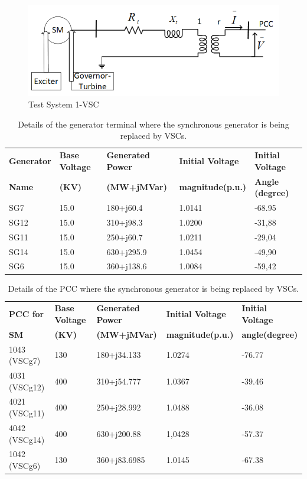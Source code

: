 \documentclass{report}
\begin{document}
\begin{figure}
    \centering
    \includegraphics[width=0.7\linewidth]{Figure_Nordic/SMIB.png}
    \caption{Test System 1-VSC}
    \label{fig:SMVSC}
\end{figure}

\begin{table}[H]
\centering
\caption{Details of the generator terminal where the synchronous generator is being replaced by VSCs.}
\begin{tabular}{|l |l| l| l| l|}
\hline
\textbf{Generator} & \textbf{Base Voltage} & \textbf{Generated Power} & \textbf{Initial Voltage}& \textbf{Initial Voltage} \\
\textbf{Name} & \textbf{(KV)} & \textbf{(MW+jMVar)} & \textbf{magnitude(p.u.)} & \textbf{Angle (degree)} \\
\hline
SG7 & 15.0 & 180+j60.4 & 1.0141 & -68.95 \\
SG12 & 15.0 & 310+j98.3 & 1.0200 & -31,88 \\
SG11 & 15.0 & 250+j60.7 & 1.0211 & -29,04 \\
SG14 & 15.0 & 630+j295.9 & 1.0454 & -49,90 \\
SG6  & 15.0 & 360+j138.6 & 1.0084 &-59,42 \\
\hline
\end{tabular}
\label{tab:SMVSC}
\end{table}


\begin{table}[H]
\centering
\caption{Details of the PCC where the synchronous generator is being replaced by VSCs.}
\begin{tabular}{|l |l| l| l| l|}
\hline
\textbf{PCC for} & \textbf{Base Voltage} & \textbf{Generated Power} & \textbf{Initial Voltage}& \textbf{Initial Voltage} \\
\textbf{SM} & \textbf{(KV)} & \textbf{(MW+jMVar)} & \textbf{magnitude(p.u.)} & \textbf{angle(degree)} \\
\hline
1043 (VSCg7) & 130 & 180+j34.133 & 1.0274 & -76.77 \\
4031 (VSCg12) & 400 & 310+j54.777 & 1.0367 & -39.46 \\
4021 (VSCg11) & 400 & 250+j28.992 & 1.0488 & -36.08 \\
4042 (VSCg14) & 400 & 630+j200.88 & 1,0428 & -57.37 \\
1042 (VSCg6) & 130 & 360+j83.6985 & 1.0145 & -67.38 \\
\hline
\end{tabular}
\label{tab:SMPCC}
\end{table}
\end{document}
